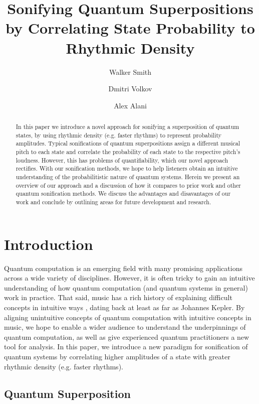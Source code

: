 \documentclass[10pt,twocolumn]{article}
\title{Sonifying Quantum Superpositions by Correlating State Probability to Rhythmic Density}
\author{Walker Smith\inst{1} \and
        Dmitri Volkov\inst{1} \and
        Alex Alani\inst{1}}
\begin{document}
\maketitle

\begin{abstract}
In this paper we introduce a novel approach for sonifying a superposition of quantum states, by using rhythmic density (e.g. faster rhythms) to represent probability amplitudes. Typical sonifications of quantum superpositions assign a different musical pitch to each state and correlate the probability of each state to the respective pitch’s loudness. However, this has problems of quantifiability, which our novel approach rectifies. With our sonification methods, we hope to help listeners obtain an intuitive understanding of the probabilitistic nature of quantum systems. Herein we present an overview of our approach and a discussion of how it compares to prior work and other quantum sonification methods. We discuss the advantages and disavantages of our work and conclude by outlining areas for future development and research.
\end{abstract}

\section{Introduction}

Quantum computation is an emerging field with many promising applications across a wide variety of disciplines\cite{ukpabi2023framework}. However, it is often tricky to gain an intuitive understanding of how quantum computation (and quantum systems in general) work in practice\cite{qcvc}. That said, music has a rich history of explaining difficult concepts in intuitive ways \cite{watzke2022}\cite{smith2022}, dating back at least as far as Johannes Kepler\cite{rodgers1979}. By aligning unintuitive concepts of quantum computation with intuitive concepts in music, we hope to enable a wider audience to understand the underpinnings of quantum computation, as well as give experienced quantum practitioners a new tool for analysis. In this paper, we introduce a new paradigm for sonification of quantum systems by correlating higher amplitudes of a state with greater rhythmic density (e.g. faster rhythms).

\subsection{Quantum Superposition}
\end{document}
